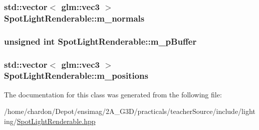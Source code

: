 \hypertarget{classSpotLightRenderable_a43ece8056bee96e36a7e7f51b9b105e2}{
\subsubsection[{m\+\_\+normals}]{\setlength{\rightskip}{0pt plus 5cm}std\+::vector$<$ glm\+::vec3 $>$ Spot\+Light\+Renderable\+::m\+\_\+normals\hspace{0.3cm}{\ttfamily [private]}}}\label{classSpotLightRenderable_a43ece8056bee96e36a7e7f51b9b105e2}
\hypertarget{classSpotLightRenderable_a3701141e0cadd3c4d6892ada7397ddf1}{
\subsubsection[{m\+\_\+p\+Buffer}]{\setlength{\rightskip}{0pt plus 5cm}unsigned int Spot\+Light\+Renderable\+::m\+\_\+p\+Buffer\hspace{0.3cm}{\ttfamily [private]}}}\label{classSpotLightRenderable_a3701141e0cadd3c4d6892ada7397ddf1}
\hypertarget{classSpotLightRenderable_a295c67f086347225b7e3f9ded409a447}{
\subsubsection[{m\+\_\+positions}]{\setlength{\rightskip}{0pt plus 5cm}std\+::vector$<$ glm\+::vec3 $>$ Spot\+Light\+Renderable\+::m\+\_\+positions\hspace{0.3cm}{\ttfamily [private]}}}\label{classSpotLightRenderable_a295c67f086347225b7e3f9ded409a447}


The documentation for this class was generated from the following file\+:\begin{DoxyCompactItemize}
\item 
/home/chardon/\+Depot/ensimag/2\+A\+\_\+\+G3\+D/practicals/teacher\+Source/include/lighting/\hyperlink{SpotLightRenderable_8hpp}{Spot\+Light\+Renderable.\+hpp}\end{DoxyCompactItemize}
